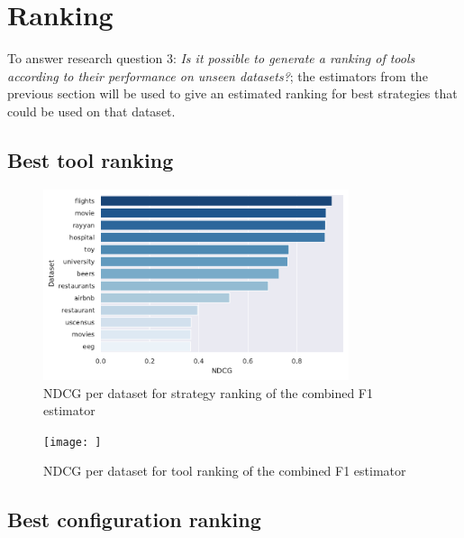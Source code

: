 \section{Ranking}
To answer research question 3: \textit{Is it possible to generate a ranking of tools according to their performance on unseen datasets?}; the estimators from the previous section will be used to give an estimated ranking for best strategies that could be used on that dataset.

\subsection{Best tool ranking}

\begin{figure}
    \centering
    \includegraphics[width=0.8\textwidth]{thesis/Figures/RQ3/15_ranking_ndcg_combined_f1.pdf}
    \caption{NDCG per dataset for strategy ranking of the combined F1 estimator}
    \label{fig:ndcg_per_strategy}
\end{figure}



\begin{figure}
    \centering
    \texttt{[image: ]}
    \caption{NDCG per dataset for tool ranking of the combined F1 estimator}
    \label{fig:ndcg_per_tool}
\end{figure}



\subsection{Best configuration ranking}

